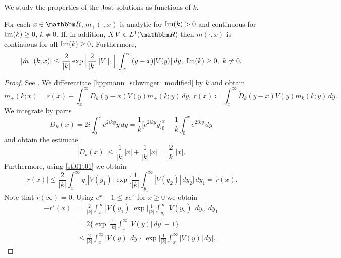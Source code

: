 We study the properties of the Jost solutions as functions of $k$.

\begin{lemma}\label{stl03t}
For each $x\in\R$, $m_+(\cdot,x)$ is analytic for $\operatorname{Im}(k) > 0$ and continuous for $\operatorname{Im}(k)\geq 0$, $k\neq 0$.
If, in addition, $XV\in L^1(\R)$ then $m(\cdot,x)$ is continuous for all $\operatorname{Im}(k)\geq 0$. Furthermore,
\begin{equation}\label{stl03t01}
  |\dot m_+(k;x)| \leq \frac{2}{|k|} \exp\Big[\frac{2}{|k|} \|V\|_1\Big]\,\int_x^\infty (y-x)|V(y)|\, dy 
     ,\ \operatorname{Im}(k)\geq 0,\ k\neq 0.
\end{equation}
\end{lemma}
\begin{proof}
See \cite[2. Lemma 1, (v), p.130]{DeiftTrubowitz1979}.
We differentiate \eqref{lippmann_schwinger_modified} by $k$ and obtain
\begin{equation*}
  \dot m_+(k;x) = r(x) + \int_x^\infty D_k(y-x)V(y)\dot m_+(k;y)\, dy,\ 
     r(x)\coloneqq \int_x^\infty \dot D_k(y-x)V(y)m_k(k;y)\, dy .
\end{equation*}
We integrate by parts
\begin{equation*}
  \dot D_k(x) = 2i \int_0^x e^{2iky} y\, dy
              = \frac{1}{k}\big[ e^{2iky}y\big]_0^x - \frac{1}{k}\int_0^x e^{2iky} \, dy
\end{equation*}
and obtain the estimate
\begin{equation*}
  |\dot D_k(x)| \leq \frac{1}{|k|} |x| + \frac{1}{|k|} |x| = \frac{2}{|k|}|x| .
\end{equation*}
Furthermore, using \eqref{stl01t01} we obtain
\begin{equation*}
  |r(x)| \leq \frac{2}{|k|} \int_x^\infty y_1|V(y_1)|\exp\big[ \frac{1}{|k|}\int_{y_1}^\infty |V(y_2)|\, dy_2\big]\, dy_1 \eqqcolon \tilde r(x) .
\end{equation*}
Note that $\tilde r(\infty)=0$. Using $e^x-1 \leq xe^x$ for $x\geq0$ we obtain
\begin{equation*}
\begin{split}
  -\tilde r'(x) 
    & = \frac{2}{|k|} \int_x^\infty |V(y_1)| \exp\big[\frac{1}{|k|}\int_{y_1}^\infty |V(y_2)|\, dy_2\big] \, dy_1\\
    & = 2 \big\{ \exp\big[ \frac{1}{|k|}\int_x^\infty |V(y)|\, dy\big] - 1 \big\}\\
    & \leq \frac{2}{|k|}\int_x^\infty |V(y)|\, dy \,\cdot\,\exp\big[ \frac{1}{|k|}\int_x^\infty |V(y)|\, dy\big] .
\end{split}
\end{equation*}

\end{proof}
